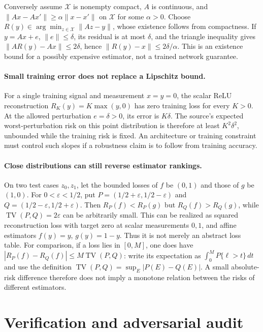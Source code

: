 \documentclass[11pt]{article}
\begin{document}
Conversely assume $\mathcal X$ is nonempty compact, $A$ is continuous, and
$\|Ax-Ax'\|\geq\alpha\|x-x'\|$ on $\mathcal X$ for some $\alpha>0$.
Choose $R(y)\in\arg\min_{z\in\mathcal X}\|Az-y\|$, whose existence follows
from compactness. If $y=Ax+e$, $\|e\|\leq\delta$, its residual is at most
$\delta$, and the triangle inequality gives
$\|AR(y)-Ax\|\leq2\delta$, hence
$\|R(y)-x\|\leq2\delta/\alpha$.
This is an existence bound for a possibly expensive estimator, not a trained
network guarantee.

\paragraph{Small training error does not replace a Lipschitz bound.}
For a single training signal and measurement $x=y=0$, the scalar ReLU
reconstruction $R_K(y)=K\max(y,0)$ has zero training loss for every $K>0$.
At the allowed perturbation $e=\delta>0$, its error is $K\delta$.
The source's expected worst-perturbation risk on this point distribution is
therefore at least $K^2\delta^2$, unbounded while the training risk is fixed.
An architecture or training constraint must control such slopes if a robustness
claim is to follow from training accuracy.

\paragraph{Close distributions can still reverse estimator rankings.}
On two test cases $z_0,z_1$, let the bounded losses of $f$ be $(0,1)$ and
those of $g$ be $(1,0)$. For $0<\varepsilon<1/2$, put
$P=(1/2+\varepsilon,1/2-\varepsilon)$ and
$Q=(1/2-\varepsilon,1/2+\varepsilon)$.
Then $R_P(f)<R_P(g)$ but $R_Q(f)>R_Q(g)$, while
$\operatorname{TV}(P,Q)=2\varepsilon$ can be arbitrarily small.
This can be realized as squared reconstruction loss with target zero at scalar
measurements $0,1$, and affine estimators $f(y)=y$, $g(y)=1-y$.
Thus it is not merely an abstract loss table.
For comparison, if a loss lies in $[0,M]$, one does have
$|R_P(f)-R_Q(f)|\leq M\operatorname{TV}(P,Q)$:
write its expectation as $\int_0^M P\{\ell>t\}\,dt$ and use the definition
$\operatorname{TV}(P,Q)=\sup_E|P(E)-Q(E)|$.
A small absolute-risk difference therefore does not imply a monotone relation
between the risks of different estimators.

\section{Verification and adversarial audit}
\end{document}
